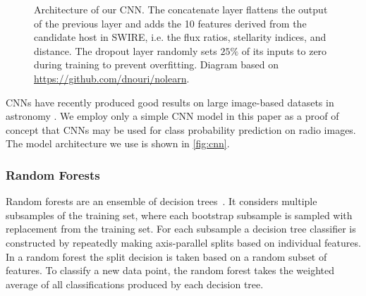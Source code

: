 \documentclass[fleqn,usenatbib,usedcolumn]{mnras}
\begin{document}
\begin{figure}
        \caption{Architecture of our CNN. The concatenate layer flattens the
          output of the previous layer and adds the 10 features derived from
          the candidate host in SWIRE, i.e. the flux ratios, stellarity
          indices, and distance. The dropout layer randomly sets $25\%$ of its
          inputs to zero during training to prevent overfitting. Diagram based
          on \url{ https://github.com/dnouri/nolearn}.}
        \label{fig:cnn}
      \end{figure}

      CNNs have recently produced good results on large image-based datasets
      in astronomy \citep[e.g.][; Lukic et al. in prep]{dieleman15cnn}. We
      employ only a simple CNN model in this paper as a proof of concept that
      CNNs may be used for class probability prediction on radio images. The
      model architecture we use is shown in \autoref{fig:cnn}.

    \subsubsection{Random Forests}
    \label{sec:random-forests}

      Random forests are an ensemble of decision
      trees~\citep{breiman01random-forest}. It considers multiple subsamples
      of the training set, where each bootstrap subsample is sampled with
      replacement from the training set. For each subsample a decision tree
      classifier is constructed by repeatedly making axis-parallel splits
      based on individual features. In a random forest the split decision is
      taken based on a random subset of features. To classify a new data
      point, the random forest takes the weighted average of all
      classifications produced by each decision tree.
\end{document}
